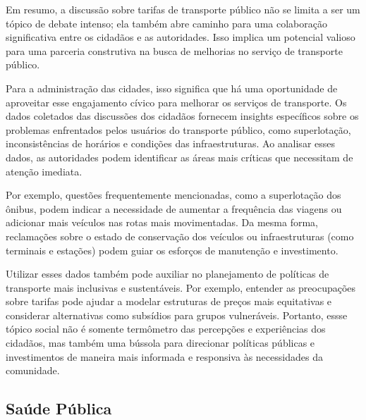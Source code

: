 Em resumo, a discussão sobre tarifas de transporte público não se limita a ser um tópico de debate intenso; ela também abre caminho para uma colaboração significativa entre os cidadãos e as autoridades. Isso implica um potencial valioso para uma parceria construtiva na busca de melhorias no serviço de transporte público.

Para a administração das cidades, isso significa que há uma oportunidade de aproveitar esse engajamento cívico para melhorar os serviços de transporte. Os dados coletados das discussões dos cidadãos fornecem insights específicos sobre os problemas enfrentados pelos usuários do transporte público, como superlotação, inconsistências de horários e condições das infraestruturas. Ao analisar esses dados, as autoridades podem identificar as áreas mais críticas que necessitam de atenção imediata.

Por exemplo, questões frequentemente mencionadas, como a superlotação dos ônibus, podem indicar a necessidade de aumentar a frequência das viagens ou adicionar mais veículos nas rotas mais movimentadas. Da mesma forma, reclamações sobre o estado de conservação dos veículos ou infraestruturas (como terminais e estações) podem guiar os esforços de manutenção e investimento.

Utilizar esses dados também pode auxiliar no planejamento de políticas de transporte mais inclusivas e sustentáveis. Por exemplo, entender as preocupações sobre tarifas pode ajudar a modelar estruturas de preços mais equitativas e considerar alternativas como subsídios para grupos vulneráveis. Portanto, essse tópico social não é somente termômetro das percepções e experiências dos cidadãos, mas também uma bússola para direcionar políticas públicas e investimentos de maneira mais informada e responsiva às necessidades da comunidade.

\subsection{Saúde Pública}
\label{sec:eventos_populares_public_health}

